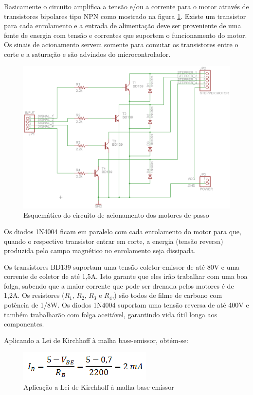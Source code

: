 Basicamente o circuito amplifica a tensão e/ou a corrente para o motor através de transistores bipolares tipo NPN como mostrado na figura \ref{esquematico2}. Existe um transistor para cada enrolamento e a entrada de alimentação deve ser proveniente de uma fonte de energia com tensão e correntes que suportem o funcionamento do motor. Os sinais de acionamento servem somente para comutar os transistores entre o corte e a saturação e são advindos do microcontrolador.

\begin{figure}[htb]
		\centering
			\includegraphics[scale=0.5]{figuras/esquematico2.png}
		\caption{Esquemático do circuito de acionamento dos motores de passo}
		\label{esquematico2}
\end{figure}

Os diodos 1N4004 ficam em paralelo com cada enrolamento do motor para que, quando o respectivo transistor entrar em corte, a energia (tensão reversa) produzida pelo campo magnético no enrolamento seja dissipada.

Os transistores BD139 suportam uma tensão coletor-emissor de até 80V e uma corrente de coletor de até 1,5A. Isto garante que eles irão trabalhar com uma boa folga, sabendo que a maior corrente que pode ser drenada pelos motores é de 1,2A. Os resistores ($R_1$, $R_2$, $R_3$ e $R_4$,) são todos de filme de carbono com potência de 1/8W. Os diodos 1N4004 suportam uma tensão reversa de até 400V e também trabalharão com folga aceitável, garantindo vida útil longa aos componentes.

Aplicando a Lei de Kirchhoff à malha base-emissor, obtém-se:

\begin{figure}[H]
		\centering
			\includegraphics[scale=1.0]{figuras/leidek.png}
		\caption{Aplicação  a Lei de Kirchhoff à malha base-emissor}
		\label{leidek}
\end{figure}

